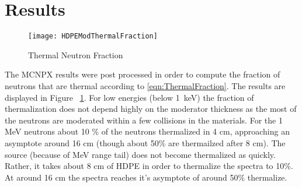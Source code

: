 \section{Results}
\label{sec:Results}
\begin{figure}[!ht]
	\centering
	\texttt{[image: HDPEModThermalFraction]}
	  \caption{Thermal Neutron Fraction}
	  \label{fig:ThermalNeutronFraction}
\end{figure}
The MCNPX results were post processed in order to compute the fraction of neutrons that are thermal according to \eqref{eqn:ThermalFraction}.
The results are displayed in  Figure ~\ref{fig:ThermalNeutronFraction}.
For low energies (below \SI{1}{\kilo\electronvolt}) the fraction of thermalization does not depend highly on the moderator thickness as the most of the neutrons are moderated within a few collisions in the materials.
For the 1 MeV neutrons about 10 \% of the neutrons thermalized in 4 cm, approaching an asymptote around 16 cm (though about 50\% are thermailzed after 8 cm).
The  source (because of MeV range tail) does not become thermalized as quickly.
Rather, it takes about 8 cm of HDPE in order to thermalize the spectra to 10\%. 
At around 16 cm the  spectra reaches it's asymptote of around 50\% thermalize.
